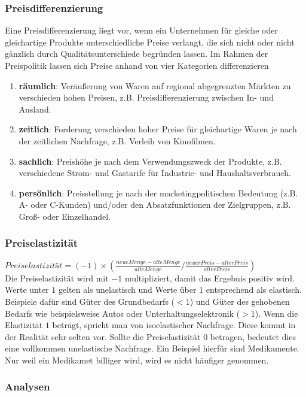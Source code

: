 \subsubsection{Preisdifferenzierung}

Eine Preisdifferenzierung liegt vor, wenn ein Unternehmen für gleiche oder gleichartige Produkte unterschiedliche Preise verlangt, die sich nicht oder nicht gänzlich durch Qualitätsunterschiede begründen lassen. Im Rahmen der Preispolitik lassen sich Preise anhand von vier Kategorien differenzieren
\begin{enumerate}
	\item {\bf räumlich}: Veräußerung von Waren auf regional abgegrenzten Märkten zu verschieden hohen Preisen, z.B. Preisdifferenzierung  zwischen In- und Ausland.
	\item {\bf zeitlich}: Forderung verschieden hoher Preise für gleichartige Waren je nach der zeitlichen Nachfrage, z.B. Verleih von Kinofilmen.
	\item {\bf sachlich}: Preishöhe je nach dem Verwendungszweck der Produkte, z.B. verschiedene Strom- und Gastarife für Industrie- und Haushaltsverbrauch.
	\item {\bf persönlich}: Preisstellung je nach der marketingpolitischen Bedeutung (z.B. A- oder C-Kunden) und/oder den Absatzfunktionen der Zielgruppen, z.B. Groß- oder Einzelhandel.
\end{enumerate}

\subsubsection{Preiselastizität}

$Preiselastizität = (-1)\times(\frac{neue Menge - alte Menge}{alte Menge} / \frac{neuer Preis - alter Preis}{alter Preis})$\\
Die Preiselastizität wird mit $-1$ multipliziert, damit das Ergebnis positiv wird. Werte unter $1$ gelten als unelastisch und Werte über $1$ entsprechend als elastisch. Beispiele dafür sind Güter des Grundbedarfs ($<1$) und Güter des gehobenen Bedarfs wie beispielsweise Autos oder Unterhaltungselektronik ($>1$). Wenn die Elastizität $1$ beträgt, spricht man von isoelastischer Nachfrage. Diese kommt in der Realität sehr selten vor. Sollte die Preiselastizität $0$ betragen, bedeutet dies eine vollkommen unelastische Nachfrage. Ein Beispiel hierfür sind Medikamente. Nur weil ein Medikamet billiger wird, wird es nicht häufiger genommen.

\subsubsection{Analysen}

